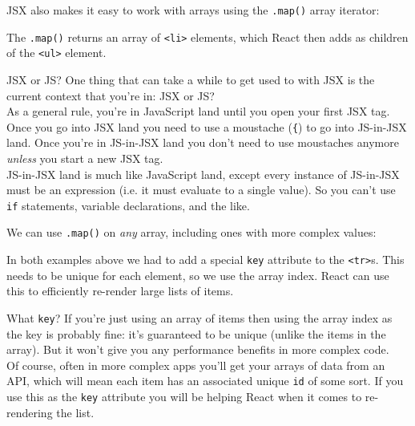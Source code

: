 JSX also makes it easy to work with arrays using the \texttt{.map()} array iterator:


The \texttt{.map()} returns an array of \texttt{<li>} elements, which React then adds as children of the \texttt{<ul>} element.

\begin{infobox}{JSX or JS?}
    One thing that can take a while to get used to with JSX is the current context that you're in: JSX or JS?
    \\

    As a general rule, you're in JavaScript land until you open your first JSX tag. Once you go into JSX land you need to use a moustache (\texttt{\{}) to go into JS-in-JSX land. Once you're in JS-in-JSX land you don't need to use moustaches anymore \textit{unless} you start a new JSX tag.
    \\

    JS-in-JSX land is much like JavaScript land, except every instance of JS-in-JSX must be an expression (i.e. it must evaluate to a single value). So you can't use \texttt{if} statements, variable declarations, and the like.

\end{infobox}


\pagebreak


We can use \texttt{.map()} on \textit{any} array, including ones with more complex values:


In both examples above we had to add a special \texttt{key} attribute to the \texttt{<tr>}s. This needs to be unique for each element, so we use the array index. React can use this to efficiently re-render large lists of items.

\begin{infobox}{What \texttt{key}?}
    If you're just using an array of items then using the array index as the key is probably fine: it's guaranteed to be unique (unlike the items in the array). But it won't give you any performance benefits in more complex code.
    \\

    Of course, often in more complex apps you'll get your arrays of data from an API, which will mean each item has an associated unique \texttt{id} of some sort. If you use this as the \texttt{key} attribute you will be helping React when it comes to re-rendering the list.
\end{infobox}



